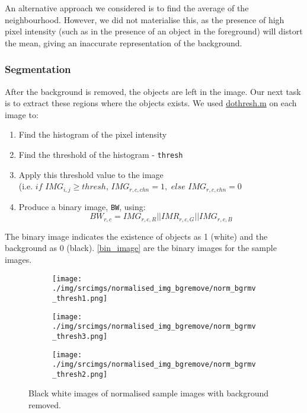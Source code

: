 \documentclass[main.tex]{subfiles}
\begin{document}
An alternative approach we considered is to find the average of the neighbourhood. However, we did not materialise this, as the presence of high pixel intensity (such as in the presence of an object in the foreground) will distort the mean, giving an inaccurate representation of the background.


\subsubsection*{Segmentation}
After the background is removed, the objects are left in the image. Our next task is to extract these regions where the objects exists. We used \hyperlink{dothresh}{dothresh.m} on each image to:
\begin{enumerate}
  \item Find the histogram of the pixel intensity
  \item Find the threshold of the histogram - \texttt{thresh}
  \item Apply this threshold value to the image\\(i.e. $if$ $IMG_{i,j} \ge thresh$, $IMG_{r,c,chn} = 1,$ $else$ $ IMG_{r,c,chn} = 0$
  \item Produce a binary image, \texttt{BW}, using:$$BW_{r,c} = IMG_{r,c,R} || IMR_{r,c,G} || IMG_{r,c,B}$$
\end{enumerate}

The binary image indicates the existence of objects as 1 (white) and the background as 0 (black). \autoref{bin_image} are the binary images for the sample images.

\begin{figure}[!h]
  \centering
  \begin{subfigure}[b]{.3\textwidth}
    \centering
    \texttt{[image: ./img/srcimgs/normalised\_img\_bgremove/norm\_bgrmv\_thresh1.png]}
  \end{subfigure}
  \begin{subfigure}[b]{.3\textwidth}
    \centering
    \texttt{[image: ./img/srcimgs/normalised\_img\_bgremove/norm\_bgrmv\_thresh3.png]}
  \end{subfigure}
  \begin{subfigure}[b]{.3\textwidth}
    \centering
    \texttt{[image: ./img/srcimgs/normalised\_img\_bgremove/norm\_bgrmv\_thresh2.png]}
  \end{subfigure}
  \caption{Black white images of normalised sample images with background removed.}
  \label{bin_image}
\end{figure}
\end{document}
